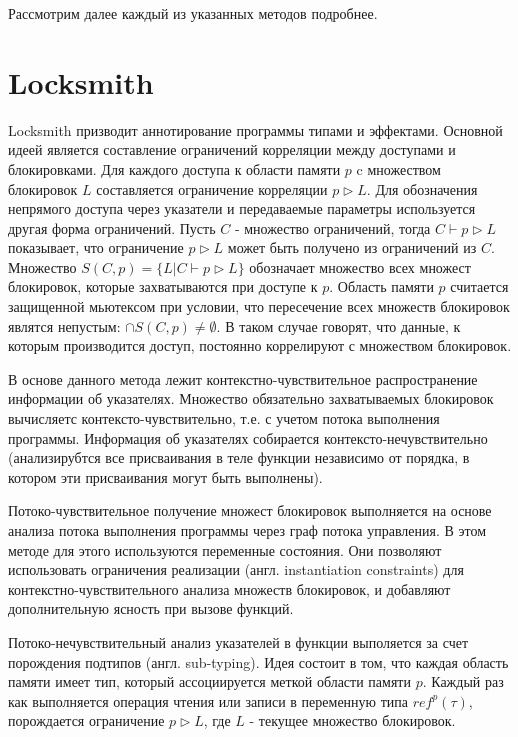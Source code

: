 Рассмотрим далее каждый из указанных методов подробнее.

\section{Locksmith}
Locksmith призводит аннотирование программы типами и эффектами. Основной идеей является составление ограничений корреляции между доступами и блокировками. Для каждого доступа к области памяти $p$ c множеством блокировок $L$ составляется ограничение корреляции $p \triangleright L$. Для обозначения непрямого доступа через указатели и передаваемые параметры используется другая форма ограничений. Пусть $C$ - множество ограничений, тогда $C \vdash p \triangleright L$ показывает, что ограничение $p \triangleright L$ может быть получено из ограничений из $C$. Множество $S(C, p) = \{L | C \vdash p \triangleright L\}$ обозначает множество всех множест блокировок, которые захватываются при доступе к $p$. Область памяти $p$ считается защищенной мьютексом при условии, что пересечение всех множеств блокировок являтся непустым: $\cap S(C, p) \neq \emptyset$. В таком случае говорят, что данные, к которым производится доступ, постоянно коррелируют с множеством блокировок.

В основе данного метода лежит контекстно-чувствительное распространение информации об указателях. Множество обязательно захватываемых блокировок вычисляетс контексто-чувствительно, т.е. с учетом потока выполнения программы. Информация об указателях собирается контексто-нечувствительно (анализирубтся все присваивания в теле функции независимо от порядка, в котором эти присваивания могут быть выполнены). 

Потоко-чувствительное получение множест блокировок выполняется на основе анализа потока выполнения программы через граф потока управления. В этом методе для этого используются переменные состояния. Они позволяют использовать ограничения реализации (англ. instantiation constraints) для контекстно-чувствительного анализа множеств блокировок, и добавляют дополнительную ясность при вызове функций.

Потоко-нечувствительный анализ указателей в функции выполяется за счет порождения подтипов (англ. sub-typing). Идея состоит в том, что каждая область памяти имеет тип, который ассоциируется меткой области памяти $p$. Каждый раз как выполняется операция чтения или записи в переменную типа $ref^{p}(\tau)$, порождается ограничение $p \triangleright L$, где $L$ - текущее множество блокировок.

